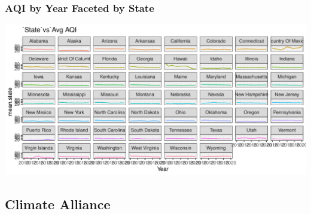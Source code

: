 \documentclass[
  ignorenonframetext,
]{beamer}
\begin{document}
\begin{frame}
\frametitle{AQI by Year Faceted by State}

\includegraphics{final_files/figure-beamer/facetAqi-1.pdf}
\end{frame}

\hypertarget{climate-alliance}{%
\subsection{Climate Alliance}\label{climate-alliance}}
\end{document}
